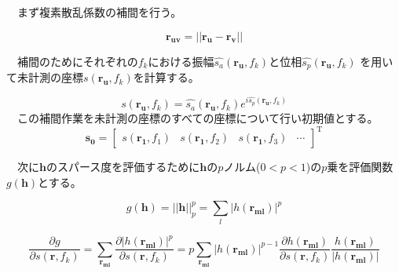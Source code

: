 \documentclass[12pt,a4paper]{jsreport}
\begin{document}
　まず複素散乱係数の補間を行う。

\begin{equation}
  \bm{r_{uv}} =
  ||\bm{r_{u}}-\bm{r_{v}}||
      \label{uvdistance}
  \end{equation}
  
　補間のためにそれぞれの$f_{k}$における振幅$\hat{s_{a}}(\bm{r_{u}},f_{k})$と位相$\hat{s_{p}}(\bm{r_{u}},f_{k})$
を用いて未計測の座標$s(\bm{r_{u}},f_{k})$を計算する。

\begin{equation}
  s(\bm{r_{u}},f_{k})=
  \hat{s_{a}}(\bm{r_{u}},f_{k})e^{i\hat{s_{p}}(\bm{r_{u}},f_{k})}
      \label{s_interpolate}
  \end{equation}
　この補間作業を未計測の座標のすべての座標について行い初期値とする。
\begin{equation}
  \bm{s_{0}} = 
  \left[
      \begin{array}{rrrr}
      s(\bm{r_{1}},f_{1})&s(\bm{r_{1}},f_{2})&s(\bm{r_{1}},f_{3})&\cdots
      \end{array}
      \right]^\mathrm{T}
      \label{defines0}
  \end{equation}

  　次に$\bm{h}$のスパース度を評価するために$\bm{h}$の$p$ノルム($0<p<1$)の$p$乗を評価関数$g(\bm{h})$とする。

  \begin{equation}
    g(\bm{h}) 
    = ||\bm{h}||_{p}^{p}
    = \sum_{l} |h(\bm{r_{ml}})|^{p}
        \label{評価関数}
    \end{equation}

  \begin{equation}
    \frac{\partial g}{\partial s(\bm{r},f_{k})}
    = \sum_{\bm{r_{ml}}}  \frac{\partial |h(\bm{r_{ml}})|^{p} }{\partial s(\bm{r},f_{k})}
    =p \sum_{\bm{r_{ml}}} |h(\bm{r_{ml}})|^{p-1} \frac{\partial h(\bm{r_{ml}}) }{\partial s(\bm{r},f_{k})}  \frac{ h(\bm{r_{ml}}) }{ |h(\bm{r_{ml}}) |}
        \label{gの微分}
    \end{equation}


    
\end{document}
